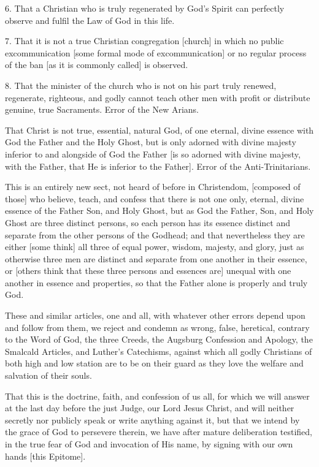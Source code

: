 6. That a Christian who is truly regenerated by God's Spirit can perfectly observe and fulfil the Law of God in this life.

7. That it is not a true Christian congregation [church] in which no public excommunication [some formal mode of excommunication] or no regular process of the ban [as it is commonly called] is observed.

8. That the minister of the church who is not on his part truly renewed, regenerate, righteous, and godly cannot teach other men with profit or distribute genuine, true Sacraments.
Error of the New Arians.

That Christ is not true, essential, natural God, of one eternal, divine essence with God the Father and the Holy Ghost, but is only adorned with divine majesty inferior to and alongside of God the Father [is so adorned with divine majesty, with the Father, that He is inferior to the Father].
Error of the Anti-Trinitarians.

This is an entirely new sect, not heard of before in Christendom, [composed of those] who believe, teach, and confess that there is not one only, eternal, divine essence of the Father Son, and Holy Ghost, but as God the Father, Son, and Holy Ghost are three distinct persons, so each person has its essence distinct and separate from the other persons of the Godhead; and that nevertheless they are either [some think] all three of equal power, wisdom, majesty, and glory, just as otherwise three men are distinct and separate from one another in their essence, or [others think that these three persons and essences are] unequal with one another in essence and properties, so that the Father alone is properly and truly God.

These and similar articles, one and all, with whatever other errors depend upon and follow from them, we reject and condemn as wrong, false, heretical, contrary to the Word of God, the three Creeds, the Augsburg Confession and Apology, the Smalcald Articles, and Luther's Catechisms, against which all godly Christians of both high and low station are to be on their guard as they love the welfare and salvation of their souls.

That this is the doctrine, faith, and confession of us all, for which we will answer at the last day before the just Judge, our Lord Jesus Christ, and will neither secretly nor publicly speak or write anything against it, but that we intend by the grace of God to persevere therein, we have after mature deliberation testified, in the true fear of God and invocation of His name, by signing with our own hands [this Epitome]. 
